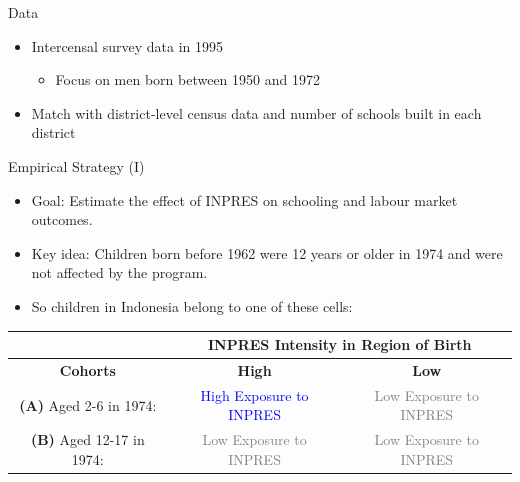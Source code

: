 \documentclass[11pt,notes=hide,aspectratio=169,mathserif]{beamer}
\begin{document}
\begin{frame}{Data}
\begin{itemize}
\item Intercensal survey data in 1995 
\begin{itemize}
    \item Focus on men born between 1950 and 1972
\end{itemize}   
\item Match with district-level census data and number of schools built in each district
\end{itemize}
\end{frame}

\begin{frame}{Empirical Strategy (I)}
\begin{itemize}
\item Goal: Estimate the effect of INPRES on schooling and labour market outcomes.
\item  Key idea: Children born before 1962 were 12 years or older in 1974 and were not affected by the program.
\item  So children in Indonesia belong to one of these cells:
\end{itemize}
{
\begin{table}
\scriptsize
\centering
\begin{tabular}{|c|c|c|}
\hline
    & \multicolumn{2}{|c|}{\textbf{INPRES Intensity in Region of Birth}}  \\
    \hline
    \textbf{Cohorts} & \textbf{High} & \textbf{Low}  \\
\hline 
\textbf{(A)} Aged 2-6 in 1974:  & \rule{0pt}{15pt}  \textcolor{blue}{High Exposure to INPRES} & \rule{0pt}{15pt} \textcolor{gray}{Low Exposure to INPRES} \\
\hline
\textbf{(B)} Aged 12-17 in 1974:  & \rule{0pt}{15pt} \textcolor{gray}{Low Exposure to INPRES} & \rule{0pt}{15pt} \textcolor{gray}{Low Exposure to INPRES} \\
\hline
\end{tabular}
\end{table}
}
\end{frame}
\end{document}
